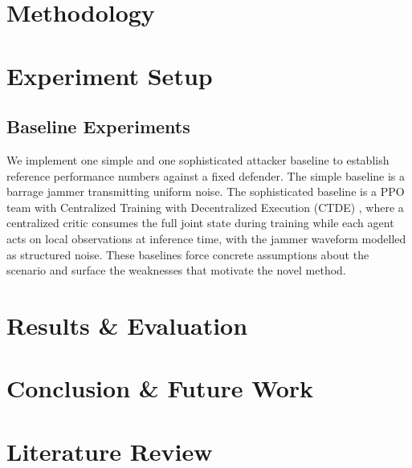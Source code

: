 \documentclass[conference]{IEEEtran}
\newcommand{\rar}[1]{{\color{blue}{[#1]}}}
\begin{document}
\section{Methodology}
\rar{TODO}

\section{Experiment Setup}
\subsection{Baseline Experiments}
We implement one simple and one sophisticated attacker baseline to establish reference performance numbers against a fixed defender. 
The simple baseline is a barrage jammer transmitting uniform noise. 
The sophisticated baseline is a PPO team with Centralized Training with Decentralized Execution (CTDE) \cite{NIPS2017_68a97503}, where a centralized critic consumes the full joint state during training while each agent acts on local observations at inference time, with the jammer waveform modelled as structured noise. These baselines force concrete assumptions about the scenario and surface the weaknesses that motivate the novel method.

\section{Results \& Evaluation}
\section{Conclusion \& Future Work}

\clearpage
\appendices

\section{Literature Review}
\end{document}
